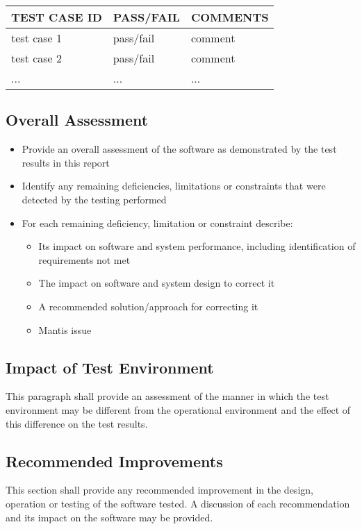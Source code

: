 \documentclass[DM,lsstdraft,STR,toc]{lsstdoc}
\begin{document}
\begin{longtable} {|p{}|p{}|p{}|}\hline
{\bf TEST CASE ID} & {\bf PASS/FAIL} & {\bf COMMENTS} \\\hline
test case 1 & pass/fail & comment \\\hline
test case 2 & pass/fail & comment \\\hline
... & ... & ... \\\hline
\end{longtable}


\subsection{Overall Assessment \label{sect:overallassessment}}
\begin{itemize}
\item Provide an overall assessment of the software as demonstrated by the test results in this report
\item Identify any remaining deficiencies, limitations or constraints that were detected by the testing performed
\item For each remaining deficiency, limitation or constraint describe:
\begin{itemize}
\item Its impact on software and system performance, including identification of requirements not met
\item The impact on software and system design to correct it
\item A recommended solution/approach for correcting it
\item Mantis issue
\end{itemize}
\end{itemize}

\subsection{Impact of Test Environment \label{sect:impact}}
This paragraph shall provide an assessment of the manner in which the test environment may be different from the
operational environment and the effect of this difference on the test results.

\subsection{Recommended Improvements \label{sect:recommendations}}
This section shall provide any recommended improvement in the design, operation or testing of the software tested. A discussion
of each recommendation and its impact on the software may be provided.
\end{document}
